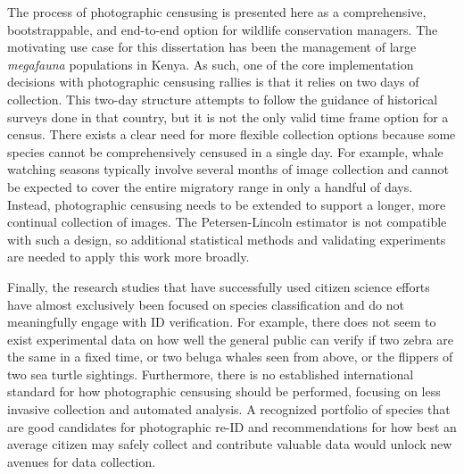The process of photographic censusing is presented here as a comprehensive, bootstrappable, and end-to-end option for wildlife conservation managers. The motivating use case for this dissertation has been the management of large \textit{megafauna} populations in Kenya. As such, one of the core implementation decisions with photographic censusing rallies is that it relies on two days of collection.  This two-day structure attempts to follow the guidance of historical surveys done in that country, but it is not the only valid time frame option for a census. There exists a clear need for more flexible collection options because some species cannot be comprehensively censused in a single day. For example, whale watching seasons typically involve several months of image collection and cannot be expected to cover the entire migratory range in only a handful of days. Instead, photographic censusing needs to be extended to support a longer, more continual collection of images.  The Petersen-Lincoln estimator is not compatible with such a design, so additional statistical methods and validating experiments are needed to apply this work more broadly.

Finally, the research studies that have successfully used citizen science efforts have almost exclusively been focused on species classification and do not meaningfully engage with ID verification. For example, there does not seem to exist experimental data on how well the general public can verify if two zebra are the same in a fixed time, or two beluga whales seen from above, or the flippers of two sea turtle sightings.  Furthermore, there is no established international standard for how photographic censusing should be performed, focusing on less invasive collection and automated analysis.  A recognized portfolio of species that are good candidates for photographic re-ID and recommendations for how best an average citizen may safely collect and contribute valuable data would unlock new avenues for data collection.
